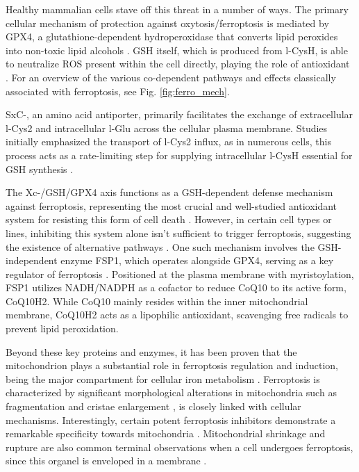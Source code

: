 Healthy mammalian cells stave off this threat in a number of ways. The primary cellular mechanism of protection against oxytosis/ferroptosis is mediated by \ac{GPX4}, a glutathione-dependent hydroperoxidase that converts lipid peroxides into non-toxic lipid alcohols \citep{gpx4}. \ac{GSH} itself, which is produced from \ac{l-CysH}, is able to neutralize \ac{ROS} present within the cell directly, playing the role of antioxidant \citep{glutath}. For an overview of the various co-dependent pathways and effects classically associated with ferroptosis, see Fig. \ref{fig:ferro_mech}.

\ac{SxC-}, an amino acid antiporter, primarily facilitates the exchange of extracellular \ac{l-Cys2} and intracellular \ac{l-Glu} across the cellular plasma membrane. Studies initially emphasized the transport of \ac{l-Cys2} influx, as in numerous cells, this process acts as a rate-limiting step for supplying intracellular \ac{l-CysH} essential for \ac{GSH} synthesis \citep{sxc-}.

The Xc-/\ac{GSH}/\ac{GPX4} axis functions as a \ac{GSH}-dependent defense mechanism against ferroptosis, representing the most crucial and well-studied antioxidant system for resisting this form of cell death \citep{gsh_system}. However, in certain cell types or lines, inhibiting this system alone isn't sufficient to trigger ferroptosis, suggesting the existence of alternative pathways \citep{fsp1}. One such mechanism involves the \ac{GSH}-independent enzyme \ac{FSP1}, which operates alongside \ac{GPX4}, serving as a key regulator of ferroptosis \citep{fsp1_2}. Positioned at the plasma membrane with myristoylation, \ac{FSP1} utilizes NADH/NADPH as a cofactor to reduce \ac{CoQ10} to its active form, \ac{CoQ10H2}. While \ac{CoQ10} mainly resides within the inner mitochondrial membrane, \ac{CoQ10H2} acts as a lipophilic antioxidant, scavenging free radicals to prevent lipid peroxidation.

Beyond these key proteins and enzymes, it has been proven that the mitochondrion plays a substantial role in ferroptosis regulation and induction, being the major compartment for cellular iron metabolism \citep{mito_ferro2}. Ferroptosis is characterized by significant morphological alterations in mitochondria such as fragmentation and cristae enlargement \citep{mito_ferro3}, is closely linked with cellular mechanisms. Interestingly, certain potent ferroptosis inhibitors demonstrate a remarkable specificity towards mitochondria \citep{mito_ferro4}. Mitochondrial shrinkage and rupture are also common terminal observations when a cell undergoes ferroptosis, since this organel is enveloped in a membrane \citep{mito_ferro}.

